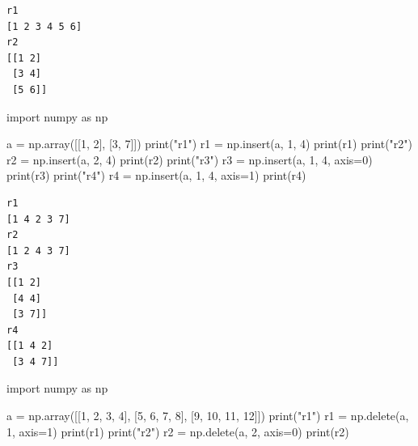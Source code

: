 \documentclass[
  polish,
  letterpaper,
  DIV=11,
  numbers=noendperiod]{scrreprt}
\newenvironment{Shaded}{\begin{snugshade}}{\end{snugshade}}
\newcommand{\BuiltInTok}[1]{\textcolor[rgb]{0.00,0.23,0.31}{#1}}
\newcommand{\DecValTok}[1]{\textcolor[rgb]{0.68,0.00,0.00}{#1}}
\newcommand{\ImportTok}[1]{\textcolor[rgb]{0.00,0.46,0.62}{#1}}
\newcommand{\NormalTok}[1]{\textcolor[rgb]{0.00,0.23,0.31}{#1}}
\newcommand{\OperatorTok}[1]{\textcolor[rgb]{0.37,0.37,0.37}{#1}}
\newcommand{\StringTok}[1]{\textcolor[rgb]{0.13,0.47,0.30}{#1}}
\begin{document}
\begin{verbatim}
r1
[1 2 3 4 5 6]
r2
[[1 2]
 [3 4]
 [5 6]]
\end{verbatim}

\begin{Shaded}
\begin{Highlighting}[]
\ImportTok{import}\NormalTok{ numpy }\ImportTok{as}\NormalTok{ np}

\NormalTok{a }\OperatorTok{=}\NormalTok{ np.array([[}\DecValTok{1}\NormalTok{, }\DecValTok{2}\NormalTok{], [}\DecValTok{3}\NormalTok{, }\DecValTok{7}\NormalTok{]])}
\BuiltInTok{print}\NormalTok{(}\StringTok{"r1"}\NormalTok{)}
\NormalTok{r1 }\OperatorTok{=}\NormalTok{ np.insert(a, }\DecValTok{1}\NormalTok{, }\DecValTok{4}\NormalTok{)}
\BuiltInTok{print}\NormalTok{(r1)}
\BuiltInTok{print}\NormalTok{(}\StringTok{"r2"}\NormalTok{)}
\NormalTok{r2 }\OperatorTok{=}\NormalTok{ np.insert(a, }\DecValTok{2}\NormalTok{, }\DecValTok{4}\NormalTok{)}
\BuiltInTok{print}\NormalTok{(r2)}
\BuiltInTok{print}\NormalTok{(}\StringTok{"r3"}\NormalTok{)}
\NormalTok{r3 }\OperatorTok{=}\NormalTok{ np.insert(a, }\DecValTok{1}\NormalTok{, }\DecValTok{4}\NormalTok{, axis}\OperatorTok{=}\DecValTok{0}\NormalTok{)}
\BuiltInTok{print}\NormalTok{(r3)}
\BuiltInTok{print}\NormalTok{(}\StringTok{"r4"}\NormalTok{)}
\NormalTok{r4 }\OperatorTok{=}\NormalTok{ np.insert(a, }\DecValTok{1}\NormalTok{, }\DecValTok{4}\NormalTok{, axis}\OperatorTok{=}\DecValTok{1}\NormalTok{)}
\BuiltInTok{print}\NormalTok{(r4)}
\end{Highlighting}
\end{Shaded}

\begin{verbatim}
r1
[1 4 2 3 7]
r2
[1 2 4 3 7]
r3
[[1 2]
 [4 4]
 [3 7]]
r4
[[1 4 2]
 [3 4 7]]
\end{verbatim}

\begin{Shaded}
\begin{Highlighting}[]
\ImportTok{import}\NormalTok{ numpy }\ImportTok{as}\NormalTok{ np}

\NormalTok{a }\OperatorTok{=}\NormalTok{ np.array([[}\DecValTok{1}\NormalTok{, }\DecValTok{2}\NormalTok{, }\DecValTok{3}\NormalTok{, }\DecValTok{4}\NormalTok{], [}\DecValTok{5}\NormalTok{, }\DecValTok{6}\NormalTok{, }\DecValTok{7}\NormalTok{, }\DecValTok{8}\NormalTok{], [}\DecValTok{9}\NormalTok{, }\DecValTok{10}\NormalTok{, }\DecValTok{11}\NormalTok{, }\DecValTok{12}\NormalTok{]])}
\BuiltInTok{print}\NormalTok{(}\StringTok{"r1"}\NormalTok{)}
\NormalTok{r1 }\OperatorTok{=}\NormalTok{ np.delete(a, }\DecValTok{1}\NormalTok{, axis}\OperatorTok{=}\DecValTok{1}\NormalTok{)}
\BuiltInTok{print}\NormalTok{(r1)}
\BuiltInTok{print}\NormalTok{(}\StringTok{"r2"}\NormalTok{)}
\NormalTok{r2 }\OperatorTok{=}\NormalTok{ np.delete(a, }\DecValTok{2}\NormalTok{, axis}\OperatorTok{=}\DecValTok{0}\NormalTok{)}
\BuiltInTok{print}\NormalTok{(r2)}
\end{Highlighting}
\end{Shaded}
\end{document}
